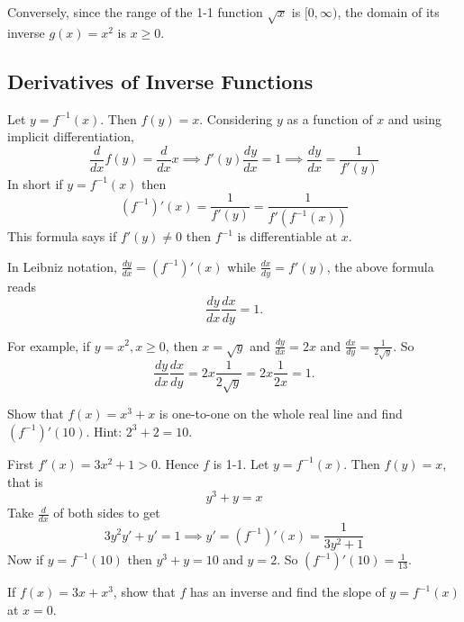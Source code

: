\documentclass[calc1-main.tex]{subfiles}
\begin{document}
Conversely, since the range of the 1-1 function $\sqrt{x}$ is $[0, \infty)$, the domain of its inverse $g(x) = x^2$ is $x\ge0$.
\subsection*{Derivatives of Inverse Functions}

Let $y = f^{-1}(x)$. Then $f(y)=x$. Considering $y$ as a function of $x$ and using implicit differentiation,
\[
  \frac{d}{dx} f(y) = \frac{d}{dx} x \implies f'(y) \frac{dy}{dx} = 1 \implies \frac{dy}{dx} = \frac{1}{f'(y)}
\]
In short if $y=f^{-1}(x)$ then
\[
  (f^{-1})'(x) = \frac{1}{f'(y)} = \frac{1}{f'(f^{-1}(x))}
\]
This formula says if $f'(y) \neq 0$ then $f^{-1}$ is differentiable at $x$.

\begin{figure}[H]
  \centering
  
\end{figure}


In Leibniz notation, $\frac{dy}{dx} = (f^{-1})'(x)$ while $\frac{dx}{dy} = f'(y)$, the above formula reads
\[
  \frac{dy}{dx} \frac{dx}{dy} = 1.
\]

For example, if $y=x^2, x\ge 0$, then $x=\sqrt{y}$ and $\frac{dy}{dx} = 2x$ and $\frac{dx}{dy} = \frac{1}{2\sqrt{y}}$. So
\[
  \frac{dy}{dx} \frac{dx}{dy} = 2x \frac{1}{2\sqrt{y}} = 2x \frac{1}{2x} = 1.
\]
\begin{example}
  Show that $f(x) = x^3 + x$ is one-to-one on the whole real line and find $(f^{-1})'(10)$. Hint: $2^3 + 2 = 10$.
\end{example}
\begin{solution}
  First $f'(x) = 3x^2 + 1 >0$. Hence $f$ is 1-1.
  Let $y = f^{-1}(x)$. Then $f(y) = x$, that is
  \[
    y^3+y = x
  \]
  Take $\frac{d}{dx}$ of both sides to get
  \[
    3 y^2 y' + y' = 1 \implies y' = (f^{-1})'(x) = \frac{1}{3y^2 + 1}
  \]
  Now if $y=f^{-1}(10)$ then $y^3+y = 10$ and $y=2$.
  So $(f^{-1})'(10) = \frac{1}{13}.$
\end{solution}

\begin{example}
  If $f(x) = 3x + x^3$, show that $f$ has an inverse and find the slope of $y=f^{-1}(x)$ at $x=0$.
\end{example}
\end{document}
